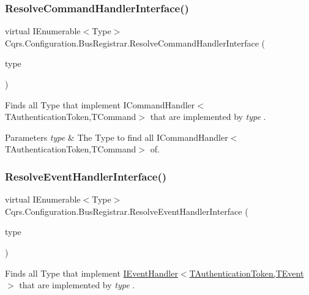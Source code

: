\subsubsection{\texorpdfstring{Resolve\+Command\+Handler\+Interface()}{ResolveCommandHandlerInterface()}}
{\footnotesize\ttfamily virtual I\+Enumerable$<$Type$>$ Cqrs.\+Configuration.\+Bus\+Registrar.\+Resolve\+Command\+Handler\+Interface (\begin{DoxyParamCaption}\item[{Type}]{type }\end{DoxyParamCaption})\hspace{0.3cm}{\ttfamily [virtual]}}



Finds all Type that implement I\+Command\+Handler$<$\+T\+Authentication\+Token,\+T\+Command$>$ that are implemented by {\itshape type} . 


\begin{DoxyParams}{Parameters}
{\em type} & The Type to find all I\+Command\+Handler$<$\+T\+Authentication\+Token,\+T\+Command$>$ of.\\
\hline
\end{DoxyParams}
\mbox{\label{classCqrs_1_1Configuration_1_1BusRegistrar_a0af1844a5f7f1c4adfde2499b054aaae_a0af1844a5f7f1c4adfde2499b054aaae}} 
\subsubsection{\texorpdfstring{Resolve\+Event\+Handler\+Interface()}{ResolveEventHandlerInterface()}}
{\footnotesize\ttfamily virtual I\+Enumerable$<$Type$>$ Cqrs.\+Configuration.\+Bus\+Registrar.\+Resolve\+Event\+Handler\+Interface (\begin{DoxyParamCaption}\item[{Type}]{type }\end{DoxyParamCaption})\hspace{0.3cm}{\ttfamily [virtual]}}



Finds all Type that implement \hyperlink{interfaceCqrs_1_1Events_1_1IEventHandler}{I\+Event\+Handler$<$\+T\+Authentication\+Token,\+T\+Event$>$} that are implemented by {\itshape type} . 



